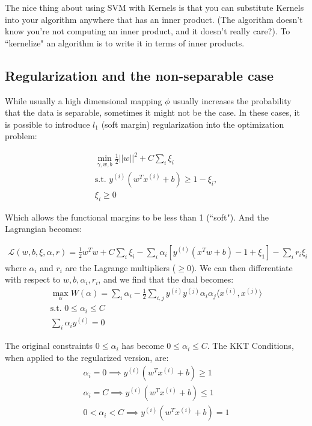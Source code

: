\documentclass[letterpaper,10pt]{article}
\begin{document}
The nice thing about using SVM with Kernels is that you can substitute Kernels into your algorithm anywhere that has an inner product. (The algorithm doesn't know you're not computing an inner product, and it doesn't really care?). To ``kernelize" an algorithm is to write it in terms of inner products.

\subsection{Regularization and the non-separable case}
While usually a high dimensional mapping $\phi$ usually increases the probability that the data is separable, sometimes it might not be the case. In these cases, it is possible to introduce $l_1$ (soft margin) regularization into the optimization problem:

\begin{align}
\min_{\gamma, w, b} \frac{1}{2} ||w||^2 + C\sum_i \xi_i \\
\text{s.t. } y^{(i)}(w^Tx^{(i)} + b) \geq 1 - \xi_i, \\
\xi_i \geq 0
\end{align}

Which allows the functional margins to be less than 1 (``soft"). And the Lagrangian becomes:

\begin{align}
\mathcal{L}(w,b,\xi,\alpha,r) = \frac{1}{2}w^Tw + C\sum_i \xi_i - \sum_i \alpha_i \left[ y^{(i)} (x^Tw + b) - 1 + \xi_1 \right] - \sum_i r_i \xi_i
\end{align}
where $\alpha_i$ and $r_i$ are the Lagrange multipliers ($\geq 0$). We can then differentiate with respect to $w,b,\alpha_i,r_i$, and we find that the dual becomes:
\begin{align}
\max_\alpha W(\alpha) = \sum_i \alpha_i - \frac{1}{2} \sum_{i,j} y^{(i)} y^{(j)} \alpha_i \alpha_j \langle x^{(i)}, x^{(j)} \rangle \\
\text{s.t. } 0 \leq \alpha_i \leq C \\
\sum_i \alpha_i y^{(i)} = 0
\end{align}


The original constraints $0 \leq \alpha_i$ has become $0 \leq \alpha_i \leq C$. The KKT Conditions, when applied to the regularized version, are:
\begin{align}
\alpha_i = 0 \implies y^{(i)} (w^T x^{(i)} + b) \geq 1\\
\alpha_i = C \implies y^{(i)} (w^T x^{(i)} + b) \leq 1\\
0 < \alpha_i < C \implies y^{(i)} (w^T x^{(i)} + b) = 1
\end{align}
\end{document}
